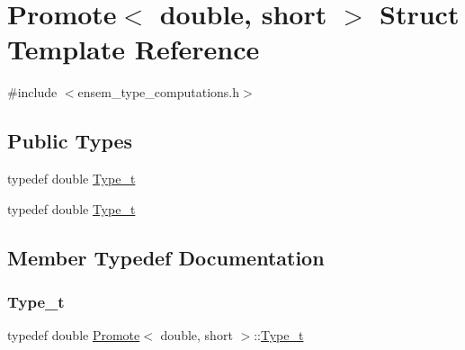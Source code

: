 \hypertarget{structPromote_3_01double_00_01short_01_4}{}\section{Promote$<$ double, short $>$ Struct Template Reference}
\label{structPromote_3_01double_00_01short_01_4}


{\ttfamily \#include $<$ensem\+\_\+type\+\_\+computations.\+h$>$}

\subsection*{Public Types}
\begin{DoxyCompactItemize}
\item 
typedef double \mbox{\hyperlink{structPromote_3_01double_00_01short_01_4_a14e4d674ead4648aefc2f0cee3552301}{Type\+\_\+t}}
\item 
typedef double \mbox{\hyperlink{structPromote_3_01double_00_01short_01_4_a14e4d674ead4648aefc2f0cee3552301}{Type\+\_\+t}}
\end{DoxyCompactItemize}


\subsection{Member Typedef Documentation}
\mbox{\label{structPromote_3_01double_00_01short_01_4_a14e4d674ead4648aefc2f0cee3552301}} 
\subsubsection{\texorpdfstring{Type\_t}{Type\_t}\hspace{0.1cm}{\footnotesize\ttfamily [1/2]}}
{\footnotesize\ttfamily typedef double \mbox{\hyperlink{structPromote}{Promote}}$<$ double, short $>$\+::\mbox{\hyperlink{structPromote_3_01double_00_01short_01_4_a14e4d674ead4648aefc2f0cee3552301}{Type\+\_\+t}}}

\mbox{\label{structPromote_3_01double_00_01short_01_4_a14e4d674ead4648aefc2f0cee3552301}} 
